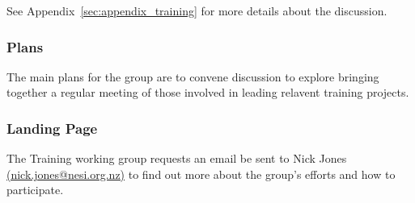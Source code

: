 See Appendix~\ref{sec:appendix_training} for more details about the discussion.

\subsubsection{Plans}

The main plans for the group are to convene discussion to explore bringing together a regular meeting of those involved in leading relavent training projects.

\subsubsection{Landing Page}

The Training working group requests an email be sent to Nick Jones \href{mailto:nick.jones@nesi.org.nz}{(nick.jones@nesi.org.nz)} to find out more about the group's efforts and how to participate.
